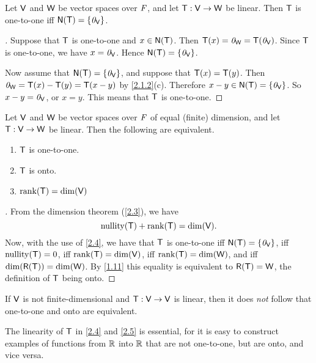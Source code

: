 \begin{thm}\label{2.4}
	Let \(\mathsf{V}\) and \(\mathsf{W}\) be vector spaces over \(\mathit{F}\), and let \(\mathsf{T} : \mathsf{V} \to \mathsf{W}\) be linear.
	Then \(\mathsf{T}\) is one-to-one iff \(\ns{\T} = \set{\zv_{\V}}\).
\end{thm}

\begin{proof}[]
	Suppose that \(\mathsf{T}\) is one-to-one and \(x \in \ns{\T}\).
	Then \(\mathsf{T}(x) = \mathit{0}_{\mathsf{W}} = \mathsf{T}(\mathit{0}_{\mathsf{V}})\).
	Since \(\mathsf{T}\) is one-to-one, we have \(x = \mathit{0}_{\mathsf{V}}\).
	Hence \(\ns{\T} = \set{\zv_{\V}}\).

	Now assume that \(\ns{\T} = \set{\zv_{\V}}\), and suppose that \(\mathsf{T}(x) = \mathsf{T}(y)\).
	Then \(\mathit{0}_{\mathsf{W}} = \mathsf{T}(x) - \mathsf{T}(y) = \mathsf{T}(x - y)\) by \cref{2.1.2}(c).
	Therefore \(x - y \in \ns{\T} = \set{\zv_{\V}}\).
	So \(x - y = \mathit{0}_{\mathsf{V}}\), or \(x = y\).
	This means that \(\mathsf{T}\) is one-to-one.
\end{proof}

\begin{thm}\label{2.5}
	Let \(\mathsf{V}\) and \(\mathsf{W}\) be vector spaces over \(\mathit{F}\) of equal (finite) dimension, and let \(\mathsf{T} : \mathsf{V} \to \mathsf{W}\) be linear.
	Then the following are equivalent.
	\begin{enumerate}
		\item \(\mathsf{T}\) is one-to-one.
		\item \(\mathsf{T}\) is onto.
		\item \(\rk{\T} = \dim(\V)\)
	\end{enumerate}
\end{thm}

\begin{proof}[]
	From the dimension theorem (\cref{2.3}), we have
	\[
		\nt{\T} + \rk{\T} = \dim(\V).
	\]
	Now, with the use of \cref{2.4}, we have that \(\mathsf{T}\) is one-to-one iff \(\ns{\T} = \set{\zv_{\V}}\), iff \(\nt{\T} = 0\), iff \(\rk{\T} = \dim(\V)\), iff \(\rk{\T} = \dim(\W)\), and iff \(\dim(\rg{\T}) = \dim(\W)\).
	By \cref{1.11} this equality is equivalent to \(\rg{\T} = \W\), the definition of \(\mathsf{T}\) being onto.
\end{proof}

\begin{note}
	If \(\mathsf{V}\) is not finite-dimensional and \(\mathsf{T} : \mathsf{V} \to \mathsf{V}\) is linear, then it does \emph{not} follow that one-to-one and onto are equivalent.

	The linearity of \(\mathsf{T}\) in \cref{2.4} and \cref{2.5} is essential, for it is easy to construct examples of functions from \(\mathbb{R}\) into \(\mathbb{R}\) that are not one-to-one, but are onto, and vice versa.
\end{note}

